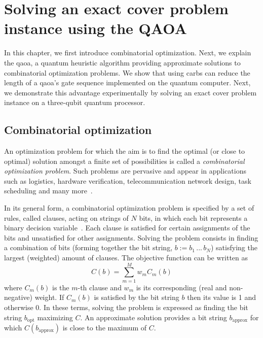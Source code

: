 \chapter{Solving an exact cover problem instance using the QAOA} \label{ch:qaoa}
In this chapter, we first introduce combinatorial optimization. Next, we explain the \gls{qaoa}, a quantum heuristic algorithm providing approximate solutions to combinatorial optimization problems. We show that using \glspl{carb} can reduce the length of a \gls{qaoa}'s gate sequence implemented on the quantum computer. Next, we demonstrate this advantage experimentally by solving an exact cover problem instance on a three-qubit quantum processor.

\section{Combinatorial optimization}
An optimization problem for which the aim is to find the optimal (or close to optimal) solution amongst a finite set of possibilities is called a \textit{combinatorial optimization problem}.  Such problems are pervasive and appear in applications such as logistics, hardware verification, telecommunication network design, task scheduling and many more~\cite{Sbihi2007CombinatorialA, Coles2018QuantumBeginners, 2014ApplicationsOptimization}.

In its general form, a combinatorial optimization problem is specified by a set of rules, called clauses, acting on strings of $N$ bits, in which each bit represents a binary decision variable~\cite{Farhi2014AAlgorithm}.  Each clause is satisfied for certain assignments of the bits and unsatisfied for other assignments. Solving the problem consists in finding a combination of bits (forming together the bit string, $b := b_1 \, ...\, b_N$) satisfying the largest (weighted) amount of clauses. The objective function can be written as 
\begin{equation} \label{eq:qaoa_clauses}
    C(b) = \sum_{m=1}^M w_m C_m(b)
\end{equation}
where $C_m(b)$ is the $m$-th clause and $w_m$ is its corresponding (real and non-negative) weight. If $C_m(b)$ is satisfied by the bit string $b$ then its value is 1 and otherwise 0. In these terms, solving the problem is expressed as finding the bit string $b_\text{opt}$ maximizing $C$. An approximate solution provides a bit string $b_{\text{approx}}$ for which  $C(b_{\text{approx}})$ is close to the maximum of $C$.


